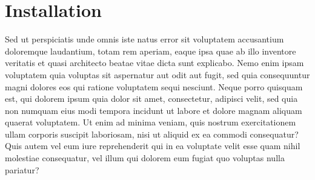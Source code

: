\documentclass[letterpaper,10pt,english]{sphinxmanual}
\begin{document}
\section{Installation}
\label{docs/installation:installation}\label{docs/installation::doc}\label{docs/installation:id1}
Sed ut perspiciatis unde omnis iste natus error sit voluptatem accusantium doloremque laudantium, totam rem aperiam, eaque ipsa quae ab illo inventore veritatis et quasi architecto beatae vitae dicta sunt explicabo. Nemo enim ipsam voluptatem quia voluptas sit aspernatur aut odit aut fugit, sed quia consequuntur magni dolores eos qui ratione voluptatem sequi nesciunt. Neque porro quisquam est, qui dolorem ipsum quia dolor sit amet, consectetur, adipisci velit, sed quia non numquam eius modi tempora incidunt ut labore et dolore magnam aliquam quaerat voluptatem. Ut enim ad minima veniam, quis nostrum exercitationem ullam corporis suscipit laboriosam, nisi ut aliquid ex ea commodi consequatur? Quis autem vel eum iure reprehenderit qui in ea voluptate velit esse quam nihil molestiae consequatur, vel illum qui dolorem eum fugiat quo voluptas nulla pariatur?
\end{document}
